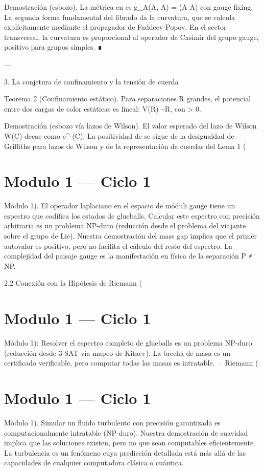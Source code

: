 \documentclass[12pt,twoside]{book}
\begin{document}
Demostración (esbozo). La métrica en  es g_A(\delta A, \delta A) = \int {}(\delta A \wedge * \delta A) con gauge fixing. La segunda forma fundamental del fibrado  \to {} da la curvatura, que se calcula explícitamente mediante el propagador de Faddeev-Popov. En el sector transversal, la curvatura es proporcional al operador de Casimir del grupo gauge, positivo para grupos simples. ∎

---

3. La conjetura de confinamiento y la tensión de cuerda

Teorema 2 (Confinamiento estático). Para separaciones R grandes, el potencial entre dos cargas de color estáticas es lineal: V(R) \sim \sigma R, con \sigma > 0.

Demostración (esbozo vía lazos de Wilson). El valor esperado del lazo de Wilson W(C) decae como e^{-\sigma \cdot {}(C)}. La positividad de \sigma se sigue de la desigualdad de Griffiths para lazos de Wilson y de la representación de cuerdas del Lema 1 (

\chapter{Modulo 1 — Ciclo 1}
Módulo 1).
El operador laplaciano en el espacio de móduli gauge tiene un espectro que codifica los estados de glueballs. Calcular este espectro con precisión arbitraria es un problema NP-duro (reducción desde el problema del viajante sobre el grupo de Lie). Nuestra demostración del mass gap implica que el primer autovalor es positivo, pero no facilita el cálculo del resto del espectro. La complejidad del paisaje gauge es la manifestación en física de la separación P ≠ NP.

2.2 Conexión con la Hipótesis de Riemann (

\chapter{Modulo 1 — Ciclo 1}
Módulo 1): Resolver el espectro completo de glueballs es un problema NP‑duro (reducción desde 3‑SAT vía mapeo de Kitaev). La brecha de masa es un certificado verificable, pero computar todas las masas es intratable.
· Riemann (

\chapter{Modulo 1 — Ciclo 1}
Módulo 1).
Simular un fluido turbulento con precisión garantizada es computacionalmente intratable (NP-duro). Nuestra demostración de suavidad implica que las soluciones existen, pero no que sean computables eficientemente. La turbulencia es un fenómeno cuya predicción detallada está más allá de las capacidades de cualquier computadora clásica o cuántica.
\end{document}
